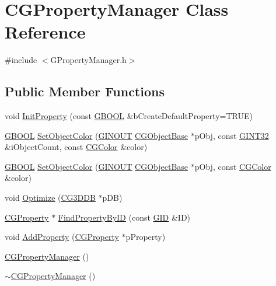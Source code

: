 \hypertarget{class_c_g_property_manager}{}\section{C\+G\+Property\+Manager Class Reference}
\label{class_c_g_property_manager}


{\ttfamily \#include $<$G\+Property\+Manager.\+h$>$}

\subsection*{Public Member Functions}
\begin{DoxyCompactItemize}
\item 
void \hyperlink{class_c_g_property_manager_a6f7d690b21b89583f511ca310fe326e0}{Init\+Property} (const \hyperlink{_g_types_8h_a2901915743626352a6820c5405f556dc}{G\+B\+O\+O\+L} \&b\+Create\+Default\+Property=T\+R\+U\+E)
\item 
\hyperlink{_g_types_8h_a2901915743626352a6820c5405f556dc}{G\+B\+O\+O\+L} \hyperlink{class_c_g_property_manager_aaad652565644997a952bb6851f2081e8}{Set\+Object\+Color} (\hyperlink{_g_types_8h_a3fc97b512f82d8e1a710da1235f9142a}{G\+I\+N\+O\+U\+T} \hyperlink{class_c_g_object_base}{C\+G\+Object\+Base} $\ast$p\+Obj, const \hyperlink{_g_types_8h_a40d8bc7c06b9e72906852691a4bf888e}{G\+I\+N\+T32} \&i\+Object\+Count, const \hyperlink{class_c_g_color}{C\+G\+Color} \&color)
\item 
\hyperlink{_g_types_8h_a2901915743626352a6820c5405f556dc}{G\+B\+O\+O\+L} \hyperlink{class_c_g_property_manager_afa7aa3e26844505204a156aace6d209d}{Set\+Object\+Color} (\hyperlink{_g_types_8h_a3fc97b512f82d8e1a710da1235f9142a}{G\+I\+N\+O\+U\+T} \hyperlink{class_c_g_object_base}{C\+G\+Object\+Base} $\ast$p\+Obj, const \hyperlink{class_c_g_color}{C\+G\+Color} \&color)
\item 
void \hyperlink{class_c_g_property_manager_a2c073c4a32589c9f38eabab52126c415}{Optimize} (\hyperlink{class_c_g3_d_d_b}{C\+G3\+D\+D\+B} $\ast$p\+D\+B)
\item 
\hyperlink{class_c_g_property}{C\+G\+Property} $\ast$ \hyperlink{class_c_g_property_manager_a420c6cca18fe17ef7f48e02eafa6f1e2}{Find\+Property\+By\+I\+D} (const \hyperlink{_g_types_8h_a5b96ecb16d8e437977d12cd40aa6f6d8}{G\+I\+D} \&I\+D)
\item 
void \hyperlink{class_c_g_property_manager_ac228a052935837c455338b6693c0a452}{Add\+Property} (\hyperlink{class_c_g_property}{C\+G\+Property} $\ast$p\+Property)
\item 
\hyperlink{class_c_g_property_manager_a55ee741194fb2e82223493944639df88}{C\+G\+Property\+Manager} ()
\item 
\hyperlink{class_c_g_property_manager_a434d8749c184c4117db3642033005366}{$\sim$\+C\+G\+Property\+Manager} ()
\end{DoxyCompactItemize}


